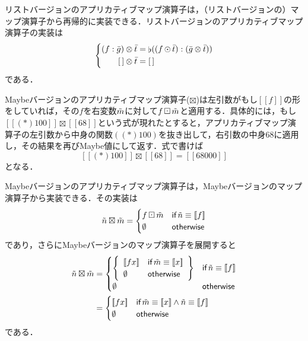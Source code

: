 \documentclass[a5paper,draft]{jsbook}
\def\[{\left[\!\left[}
\def\]{\right]\!\right]}
\newcommand{\mathMaybeWith}[1]{\[#1\]}
\newcommand{\mathListVar}[1]{\Bar{#1}}
\newcommand{\mathMaybeVar}[1]{\Tilde{#1}}
\newcommand{\mathEmptyList}{{[\,]}}%
\newcommand{\mathNothing}{\emptyset}%
\DeclareMathOperator{\mathConcat}{\flat}%
\newcommand{\mathBinaryOperator}[1]{\operatorname{#1}}
\newcommand{\mathApplicativeMap}{\otimes}
\newcommand{\mathApplicativeMaybeMap}{\boxtimes}
\newcommand{\mathMap}{\mathBinaryOperator{\odot}}
\newcommand{\mathMaybeMap}{\mathBinaryOperator{\boxdot}}
\newcommand{\mathKeyword}[1]{\operatorname{\textsf{#1}}}
\newcommand{\mathIf}{\mathKeyword{if}}
\newcommand{\mathOtherwise}{\mathKeyword{otherwise}}
\begin{document}
リストバージョンのアプリカティブマップ演算子は，（リストバージョンの）マップ演算子から再帰的に実装できる．リストバージョンのアプリカティブマップ演算子の実装は
\begin{equation}
\left\{
\begin{split}
(f:\mathListVar{g})\mathApplicativeMap\mathListVar{t}&=\mathConcat((f\mathMap\mathListVar{t}):(\mathListVar{g}\mathApplicativeMap\mathListVar{t}))\\
\mathEmptyList\mathApplicativeMap\mathListVar{t}&=\mathEmptyList
\end{split}
\right.
\end{equation}
である．

Maybeバージョンのアプリカティブマップ演算子($\mathApplicativeMaybeMap$)は左引数がもし$\mathMaybeWith{f}$の形をしていれば，その$f$を右変数$\mathMaybeVar{m}$に対して$f\mathMaybeMap\mathMaybeVar{m}$と適用する．具体的には，もし$\mathMaybeWith{(*)100}\mathApplicativeMaybeMap{}\mathMaybeWith{68}$という式が現れたとすると，アプリカティブマップ演算子の左引数から中身の関数$((*)100)$を抜き出して，右引数の中身$68$に適用し，その結果を再びMaybe値にして返す．式で書けば$$\mathMaybeWith{(*)100}\mathApplicativeMaybeMap{}\mathMaybeWith{68}=\mathMaybeWith{68000}$$となる．

Maybeバージョンのアプリカティブマップ演算子は，Maybeバージョンのマップ演算子から実装できる．その実装は
\begin{equation}
\mathMaybeVar{n}\mathApplicativeMaybeMap\mathMaybeVar{m}=\begin{cases}
f\mathMaybeMap\mathMaybeVar{m}&\mathIf\mathMaybeVar{n}\equiv\mathMaybeWith{f}\\
\mathNothing&\mathOtherwise
\end{cases}
\end{equation}
であり，さらにMaybeバージョンのマップ演算子を展開すると
\begin{align*}
\mathMaybeVar{n}\mathApplicativeMaybeMap\mathMaybeVar{m}&=\begin{cases}
\left\{
\begin{array}{ll}
\mathMaybeWith{fx}&\mathIf\mathMaybeVar{m}\equiv\mathMaybeWith{x}\\
\mathNothing&\mathOtherwise
\end{array}\right\}&\mathIf\mathMaybeVar{n}\equiv\mathMaybeWith{f}\\
\mathNothing&\mathOtherwise
\end{cases}\\
&=\begin{cases}
\mathMaybeWith{fx}&\mathIf\mathMaybeVar{m}\equiv\mathMaybeWith{x}\wedge\mathMaybeVar{n}\equiv\mathMaybeWith{f}\\
\mathNothing&\mathOtherwise
\end{cases}
\end{align*}
である．
\end{document}

